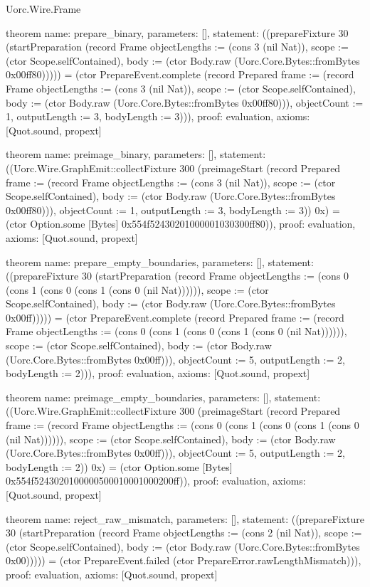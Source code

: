 \begin{lexlean}{Uorc.Wire.Frame}
\begin{semanticmodule}
theorem{
  name: prepare_binary,
  parameters: [],
  statement: ((prepareFixture 30 (startPreparation (record Frame {objectLengths := (cons 3 (nil Nat)), scope := (ctor Scope.selfContained), body := (ctor Body.raw (Uorc.Core.Bytes::fromBytes 0x00ff80))}))) = (ctor PrepareEvent.complete (record Prepared {frame := (record Frame {objectLengths := (cons 3 (nil Nat)), scope := (ctor Scope.selfContained), body := (ctor Body.raw (Uorc.Core.Bytes::fromBytes 0x00ff80))}), objectCount := 1, outputLength := 3, bodyLength := 3}))),
  proof: evaluation{},
  axioms: [Quot.sound, propext]
}

theorem{
  name: preimage_binary,
  parameters: [],
  statement: ((Uorc.Wire.GraphEmit::collectFixture 300 (preimageStart (record Prepared {frame := (record Frame {objectLengths := (cons 3 (nil Nat)), scope := (ctor Scope.selfContained), body := (ctor Body.raw (Uorc.Core.Bytes::fromBytes 0x00ff80))}), objectCount := 1, outputLength := 3, bodyLength := 3})) 0x) = (ctor Option.some [Bytes] 0x554f52430201000001030300ff80)),
  proof: evaluation{},
  axioms: [Quot.sound, propext]
}

theorem{
  name: prepare_empty_boundaries,
  parameters: [],
  statement: ((prepareFixture 30 (startPreparation (record Frame {objectLengths := (cons 0 (cons 1 (cons 0 (cons 1 (cons 0 (nil Nat)))))), scope := (ctor Scope.selfContained), body := (ctor Body.raw (Uorc.Core.Bytes::fromBytes 0x00ff))}))) = (ctor PrepareEvent.complete (record Prepared {frame := (record Frame {objectLengths := (cons 0 (cons 1 (cons 0 (cons 1 (cons 0 (nil Nat)))))), scope := (ctor Scope.selfContained), body := (ctor Body.raw (Uorc.Core.Bytes::fromBytes 0x00ff))}), objectCount := 5, outputLength := 2, bodyLength := 2}))),
  proof: evaluation{},
  axioms: [Quot.sound, propext]
}

theorem{
  name: preimage_empty_boundaries,
  parameters: [],
  statement: ((Uorc.Wire.GraphEmit::collectFixture 300 (preimageStart (record Prepared {frame := (record Frame {objectLengths := (cons 0 (cons 1 (cons 0 (cons 1 (cons 0 (nil Nat)))))), scope := (ctor Scope.selfContained), body := (ctor Body.raw (Uorc.Core.Bytes::fromBytes 0x00ff))}), objectCount := 5, outputLength := 2, bodyLength := 2})) 0x) = (ctor Option.some [Bytes] 0x554f5243020100000500010001000200ff)),
  proof: evaluation{},
  axioms: [Quot.sound, propext]
}

theorem{
  name: reject_raw_mismatch,
  parameters: [],
  statement: ((prepareFixture 30 (startPreparation (record Frame {objectLengths := (cons 2 (nil Nat)), scope := (ctor Scope.selfContained), body := (ctor Body.raw (Uorc.Core.Bytes::fromBytes 0x00))}))) = (ctor PrepareEvent.failed (ctor PrepareError.rawLengthMismatch))),
  proof: evaluation{},
  axioms: [Quot.sound, propext]
}
\end{semanticmodule}
\end{lexlean}
